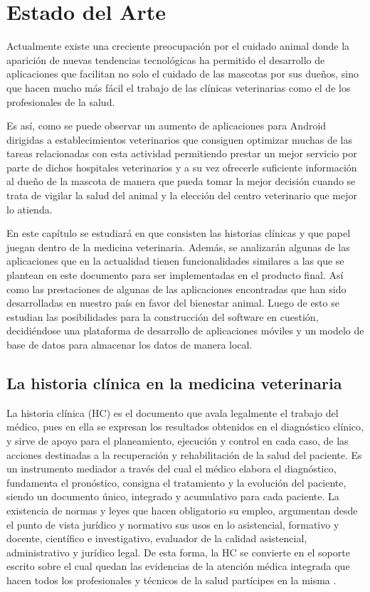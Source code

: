 
\chapter{Estado del Arte}\label{chapter:introduction}

Actualmente existe una creciente preocupación por el cuidado animal donde la aparición de nuevas tendencias tecnológicas ha permitido el desarrollo de aplicaciones que facilitan no solo el cuidado de las mascotas por sus dueños, sino que hacen mucho más fácil el trabajo de las clínicas veterinarias como el de los profesionales de la salud.

Es así, como se puede observar un aumento de aplicaciones para Android dirigidas a establecimientos veterinarios que consiguen optimizar muchas de las tareas relacionadas con esta actividad permitiendo prestar un mejor servicio por parte de dichos hospitales veterinarios y a su vez ofrecerle suficiente información al dueño de la mascota de manera que pueda tomar la mejor decisión cuando se trata de vigilar la salud del animal y la elección del centro veterinario que mejor lo atienda.

En este capítulo se estudiará en que consisten las historias clínicas y que papel juegan dentro de la medicina veterinaria. Además, se analizarán algunas de las aplicaciones que en la actualidad tienen funcionalidades similares a las que se plantean en este documento para ser implementadas en el producto final. Así como las prestaciones de algunas de las aplicaciones encontradas que han sido desarrolladas en nuestro país en favor del bienestar animal. Luego de esto se estudian las posibilidades para la construcción del software en cuestión, decidiéndose una plataforma de desarrollo de aplicaciones móviles y un modelo de base de datos para almacenar los datos de manera local.\newpage


\section{La historia clínica en la medicina veterinaria}

La historia clínica (HC) es el documento que avala legalmente el trabajo del médico, pues en ella se expresan los resultados obtenidos en el diagnóstico clínico, y sirve de apoyo para el planeamiento, ejecución y control en cada caso, de las acciones destinadas a la recuperación y rehabilitación de la salud del paciente. Es un instrumento mediador a través del cual el médico elabora el diagnóstico, fundamenta el pronóstico, consigna el tratamiento y la evolución del paciente, siendo un documento único, integrado y acumulativo para cada paciente. La existencia de normas y leyes que hacen obligatorio su empleo, argumentan desde el punto de vista jurídico y normativo sus usos en lo asistencial, formativo y docente, científico e investigativo, evaluador de la calidad asistencial, administrativo y jurídico legal. De esta forma, la HC se convierte en el soporte escrito sobre el cual quedan las evidencias de la atención médica integrada que hacen todos los profesionales y técnicos de la salud partícipes en la misma . 

